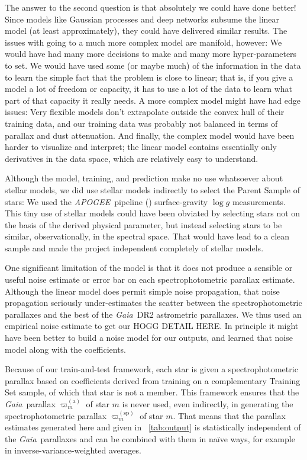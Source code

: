 \documentclass[modern]{aastex62}
\newcommand{\acronym}[1]{{\small{#1}}}
\newcommand{\project}[1]{\textsl{#1}}
\newcommand{\apogee}{\project{\acronym{APOGEE}}}
\newcommand{\gaia}{\project{Gaia}}
\newcommand{\logg}{\log g}
\newcommand{\gparallax}{\varpi^{(\mathrm{a})}}
\newcommand{\sparallax}{\varpi^{(\mathrm{sp})}}
\begin{document}
The answer to the second question is that absolutely we could have done better!
Since models like Gaussian processes and deep networks subsume the linear model
(at least approximately), they could have delivered similar results.
The issues with going to a much more complex model are manifold, however:
We would have had many more decisions to make and many more hyper-parameters
to set.
We would have used some (or maybe much) of the information in the data to learn
the simple fact that the problem is close to linear; that is, if you give a model
a lot of freedom or capacity, it has to use a lot of the data to learn what part
of that capacity it really needs.
A more complex model might have had edge issues: Very flexible models don't extrapolate
outside the convex hull of their training data, and our training data was probably not
balanced in terms of parallax and dust attenuation.
And finally, the complex model would have been harder to visualize and interpret;
the linear model contains essentially only derivatives in the data space, which are
relatively easy to understand.

Although the model, training, and prediction make no use whatsoever about stellar
models, we did use stellar models indirectly to select the Parent Sample of stars:
We used the \apogee\ pipeline (\citealt{aspcap}) surface-gravity $\logg$ measurements.
This tiny use of stellar models could have been obviated by selecting stars not
on the basis of the derived physical parameter, but instead selecting stars to
be similar, observationally, in the spectral space.
That would have lead to a clean sample and made the project independent completely
of stellar models.

One significant limitation of the model is that it does not produce a sensible or
useful noise estimate or error bar on each spectrophotometric parallax estimate.
Although the linear model does permit simple noise propagation, that noise propagation
seriously under-estimates the scatter between the spectrophotometric parallaxes
and the best of the \gaia\ \acronym{DR2} astrometric parallaxes.
We thus used an empirical noise estimate to get our HOGG DETAIL HERE.
In principle it might have been better to build a noise model for our outputs,
and learned that noise model along with the coefficients.

Because of our train-and-test framework, each star is given a spectrophotometric
parallax based on coefficients derived from training on a complementary Training Set sample, of
which that star is not a member.
This framework ensures that the \gaia\ parallax $\gparallax_m$ of star $m$ is never used,
even indirectly, in generating the spectrophotometric parallax $\sparallax_m$ of star $m$.
That means that the parallax estimates generated here and given in \tablename~\ref{tab:output}
is statistically independent of the \gaia\ parallaxes and can be combined with them in
na\"ive ways, for example in inverse-variance-weighted averages.
\end{document}
